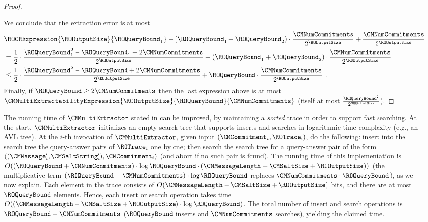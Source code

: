 \begin{proof}
\begin{itemize}
\end{itemize}
We conclude that the extraction error is at most
\begin{align*}
&\ROCRExpression{\ROOutputSize}{\ROQueryBound_{1}}
+ (\ROQueryBound_{1}+\ROQueryBound_{2}) \cdot \frac{\CMNumCommitments}{2^{\ROOutputSize}}
+ \frac{\CMNumCommitments}{2^{\ROOutputSize}} \\
&=
\frac{1}{2} \cdot \frac{\ROQueryBound_{1}^2-\ROQueryBound_{1}+2\CMNumCommitments}{2^{\ROOutputSize}}
+ (\ROQueryBound_{1}+\ROQueryBound_{2}) \cdot \frac{\CMNumCommitments}{2^{\ROOutputSize}} \\
&\leq
\frac{1}{2} \cdot \frac{\ROQueryBound^2-\ROQueryBound+2\CMNumCommitments}{2^{\ROOutputSize}}
+ \ROQueryBound \cdot \frac{\CMNumCommitments}{2^{\ROOutputSize}}
\enspace.
\end{align*}
Finally, if $\ROQueryBound \geq 2\CMNumCommitments$ then the last expression above is at most $\CMMultiExtractabilityExpression{\ROOutputSize}{\ROQueryBound}{\CMNumCommitments}$ (itself at most $\frac{\ROQueryBound^2}{2^{\ROOutputSize}}$).
\end{proof}

\begin{remark}
\label{remark:cm-multi-extractor-efficient-implementation}
The running time of $\CMMultiExtractor$ stated in  can be improved, by maintaining a \emph{sorted} trace in order to support fast searching. At the start, $\CMMultiExtractor$ initializes an empty search tree that supports inserts and searches in logarithmic time complexity (e.g., an AVL tree). At the $i$-th invocation of $\CMMultiExtractor$, given input $(\CMCommitment_{i},\ROTrace_{i})$, do the following: insert into the search tree the query-answer pairs of $\ROTrace_{i}$ one by one; then search the search tree for a query-answer pair of the form $((\CMMessage'_{i},\CMSaltString'_{i}),\CMCommitment_{i})$ (and abort if no such pair is found). The running time of this implementation is $O((\ROQueryBound + \CMNumCommitments) \cdot \log \ROQueryBound \cdot (\CMMessageLength + \CMSaltSize + \ROOutputSize))$ (the multiplicative term $(\ROQueryBound + \CMNumCommitments) \cdot \log \ROQueryBound$ replaces $\CMNumCommitments \cdot \ROQueryBound$), as we now explain. Each element in the trace consists of $O(\CMMessageLength + \CMSaltSize + \ROOutputSize)$ bits, and there are at most $\ROQueryBound$ elements. Hence, each insert or search operation takes time $O((\CMMessageLength + \CMSaltSize + \ROOutputSize) \cdot \log \ROQueryBound)$. The total number of insert and search operations is $\ROQueryBound + \CMNumCommitments$ ($\ROQueryBound$ inserts and $\CMNumCommitments$ searches), yielding the claimed time.
\end{remark}

